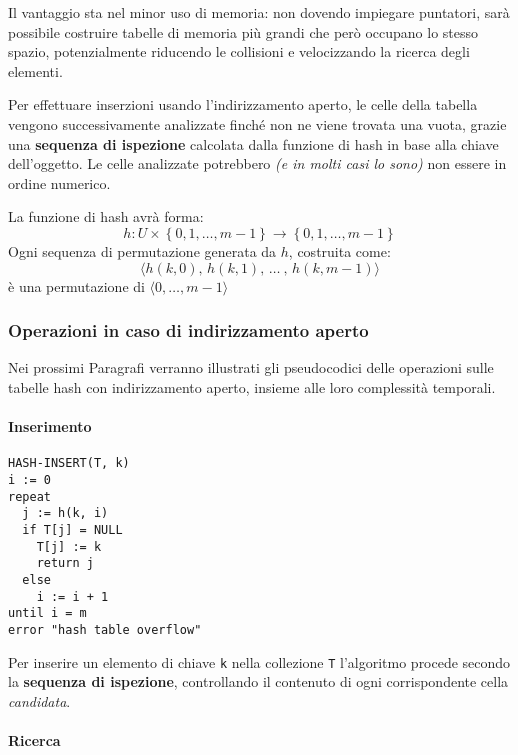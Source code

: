 \documentclass[italian, 10pt]{article}
\begin{document}
Il vantaggio sta nel minor uso di memoria: non dovendo impiegare puntatori, sarà possibile costruire tabelle di memoria più grandi che però occupano lo stesso spazio, potenzialmente riducendo le collisioni e velocizzando la ricerca degli elementi.

Per effettuare inserzioni usando l'indirizzamento aperto, le celle della tabella vengono successivamente analizzate finché non ne viene trovata una vuota, grazie una \textbf{sequenza di ispezione} calcolata dalla funzione di hash in base alla chiave dell'oggetto.
Le celle analizzate potrebbero \textit{(e in molti casi lo sono)} non essere in ordine numerico.

La funzione di hash avrà forma:
\[ h: U \times \left\{0, 1, \ldots, m-1\right\} \rightarrow \left\{0, 1, \ldots, m-1\right\} \]
Ogni sequenza di permutazione generata da \(h\), costruita come:
\[\langle h(k, 0),\, h(k, 1),\, \ldots\ ,\, h(k, m-1)  \rangle\]
è una permutazione di \(\langle 0, \ldots, m-1\rangle\)

\subsubsection{Operazioni in caso di indirizzamento aperto}

Nei prossimi Paragrafi verranno illustrati gli pseudocodici delle operazioni sulle tabelle hash con indirizzamento aperto, insieme alle loro complessità temporali.

\paragraph{Inserimento}

\begin{lstlisting}[float, style=pseudocode, caption={Pseudocodice dell'algoritmo \texttt{HASH-INSERT}}, label={sec:inserimento-ind-aperto}]
HASH-INSERT(T, k)
i := 0
repeat
  j := h(k, i)
  if T[j] = NULL
    T[j] := k
    return j
  else
    i := i + 1
until i = m
error "hash table overflow"
\end{lstlisting}

Per inserire un elemento di chiave \texttt{k} nella collezione \texttt{T} l'algoritmo procede secondo la \textbf{sequenza di ispezione}, controllando il contenuto di ogni corrispondente cella \textit{candidata}.

\paragraph{Ricerca}
\end{document}
